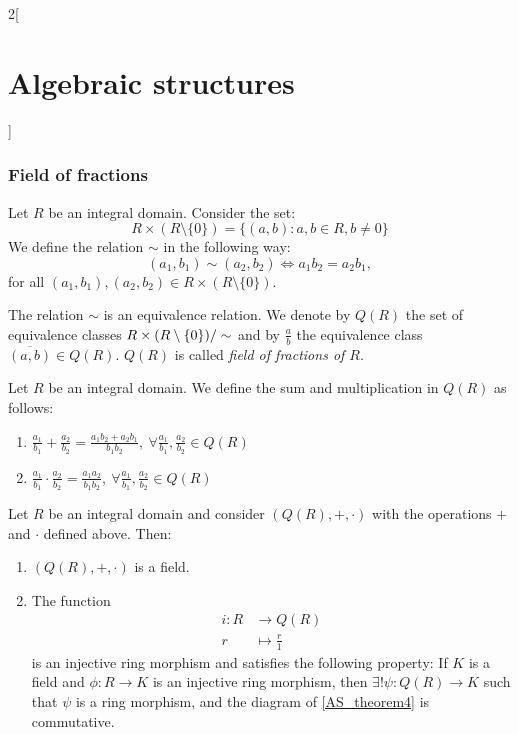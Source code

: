 \documentclass[../../../main.tex]{subfiles}
\begin{document}
\begin{multicols}{2}[\section{Algebraic structures}]
    \subsubsection{Field of fractions}
    \begin{definition}
        Let $R$ be an integral domain. Consider the set: $$R\times(R\setminus\{0\})=\{(a,b):a,b\in R,b\ne 0\}$$ We define the relation $\sim$ in the following way: $$(a_1,b_1)\sim(a_2,b_2)\iff a_1b_2=a_2b_1,$$ for all $(a_1,b_1),(a_2,b_2)\in R\times(R\setminus\{0\})$.
    \end{definition}
    \begin{lemma}
        The relation $\sim$ is an equivalence relation. We denote by $Q(R)$ the set of equivalence classes $\quot{R\times(R\setminus\{0\})}{\sim}$ and by $\frac{a}{b}$ the equivalence class $\overline{(a,b)}\in Q(R)$. $Q(R)$ is called \textit{field of fractions of $R$}.
    \end{lemma}
    \begin{definition}
        Let $R$ be an integral domain. We define the sum and multiplication in $Q(R)$ as follows:
        \begin{enumerate}
            \item $\displaystyle\frac{a_1}{b_1}+\frac{a_2}{b_2}=\frac{a_1b_2+a_2b_1}{b_1b_2},\ \forall\frac{a_1}{b_1},\frac{a_2}{b_2}\in Q(R)$
            \item $\displaystyle\frac{a_1}{b_1}\cdot\frac{a_2}{b_2}=\frac{a_1a_2}{b_1b_2},\ \forall\frac{a_1}{b_1},\frac{a_2}{b_2}\in Q(R)$
        \end{enumerate}
    \end{definition}
    \begin{theorem}
        Let $R$ be an integral domain and consider $(Q(R),+,\cdot)$ with the operations $+$ and $\cdot$ defined above. Then:
        \begin{enumerate}
            \item $(Q(R),+,\cdot)$ is a field.
            \item The function
                  \begin{align*}
                      i:R & \longrightarrow Q(R)    \\
                      r   & \longmapsto \frac{r}{1}
                  \end{align*}
                  is an injective ring morphism and satisfies the following property: If $K$ is a field and $\phi:R\rightarrow K$ is an injective ring morphism, then $\exists!\psi:Q(R)\rightarrow K$ such that $\psi$ is a ring morphism, and the diagram of \cref{AS_theorem4} is commutative.
        \end{enumerate}
        \begin{center}
            \begin{minipage}{\linewidth}
                \centering
                
                \label{AS_theorem4}
            \end{minipage}
        \end{center}
    \end{theorem}

\end{multicols}
\end{document}
